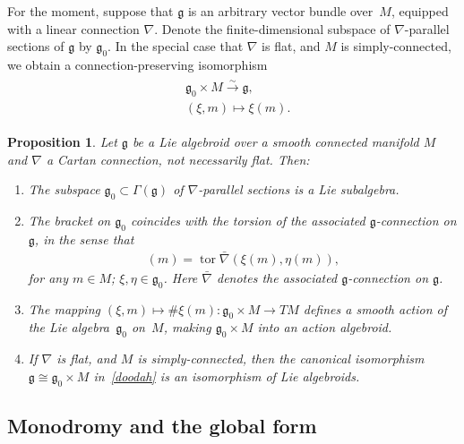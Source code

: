 \documentclass[pdftex]{sigma}
\DeclareMathOperator{\torsion}{tor}
\numberwithin{equation}{section}
\newtheorem{PropositionBlaom}[TheoremBlaom]{Proposition}
 { \theoremstyle{definition}
\newtheorem{CounterexampleBlaom}[TheoremBlaom]{Counterexample}
\newtheorem{RemarkBlaom}[TheoremBlaom]{Remark} }
\begin{document}
For the moment, suppose that $\mathfrak g$ is an arbitrary vector
bundle over~$M$, equipped with a linear connection $\nabla$. Denote
the f\/inite-dimensional subspace of $\nabla $-parallel sections of
$\mathfrak g$ by ${\mathfrak g}_0$. In the special case that $\nabla$
is f\/lat, and $M$ is simply-connected, we obtain a
connection-preserving isomorphism
\begin{gather}
  \begin{split}
 &   {\mathfrak g}_0 \times M\xrightarrow{\sim}{\mathfrak g}, \\
 &   (\xi,m)\mapsto \xi(m).
  \end{split}
  \label{doodah}
\end{gather}
\begin{PropositionBlaom} \label{Proposition2.5}
  Let $\mathfrak g$ be a Lie algebroid over a smooth connected
  manifold $M$ and $\nabla$ a Cartan connection, not necessarily
  flat. Then:
  \begin{enumerate}\itemsep=0pt
  \item[$(1)$] The subspace ${\mathfrak g}_0 \subset \Gamma({\mathfrak g})$
    of $\nabla$-parallel sections is a Lie subalgebra.
  \item[$(2)$] %
  The bracket on ${\mathfrak g}_0$ coincides with
    the torsion of the associated $\mathfrak g$-connection on
    ${\mathfrak g} $, in the sense that
    \begin{gather*}
      [\xi,\eta](m)=\torsion \bar\nabla (\xi(m),\eta(m)),
    \end{gather*}
    for any $m\in M$; $\xi,\eta \in {\mathfrak g}_0$. Here
    $\bar\nabla$ denotes the associated ${\mathfrak g} $-connection on
    $\mathfrak g$.
  \item[$(3)$] %
  The mapping $(\xi,m) \mapsto \# \xi(m) \colon
    {\mathfrak g}_0 \times M \rightarrow TM$ defines a smooth action
    of the Lie algebra~${\mathfrak g}_0$ on~$M$, making ${\mathfrak
      g}_0 \times M$ into an action algebroid.

  \item[$(4)$]%
  If $\nabla$ is flat, and $M$ is simply-connected,
    then the canonical isomorphism ${\mathfrak g} \cong {\mathfrak
      g}_0 \times M$ in~\eqref{doodah} is an isomorphism of Lie
    algebroids.
\end{enumerate}
\end{PropositionBlaom}

\subsection{Monodromy and  the global form}\label{holiday}
\end{document}
